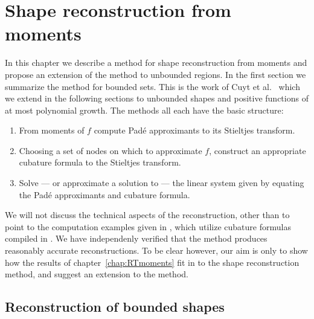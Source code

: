 

\chapter{Shape reconstruction from moments}{}
\label{chap:shapereconstruction}

In this chapter we describe a method for shape reconstruction from moments and propose an extension of the method to unbounded regions. In the first section we summarize the method for bounded sets. This is the work of Cuyt et al.~\cite{Cuyt05} which we extend in the following sections to unbounded shapes and positive functions of at most polynomial growth. The methods all each have the basic structure:
\begin{enumerate}
  \item From moments of $f$ compute Pad\'e approximants to its Stieltjes transform.
  \item Choosing a set of nodes on which to approximate $f$, construct an appropriate cubature formula to the Stieltjes transform.
  \item Solve — or approximate a solution to — the linear system given by equating the Pad\'e approximants and cubature formula. 
\end{enumerate}

We will not discuss the technical aspects of the reconstruction, other than to point to the computation examples given in \cite{Cuyt05}, which utilize cubature formulas compiled in \cite{Stro71}. We have independenly verified that the method produces reasonably accurate reconstructions. To be clear however, our aim is only to show how the results of chapter~\ref{chap:RTmoments} fit in to the shape reconstruction method, and suggest an extension to the method.

\section{Reconstruction of bounded shapes}

